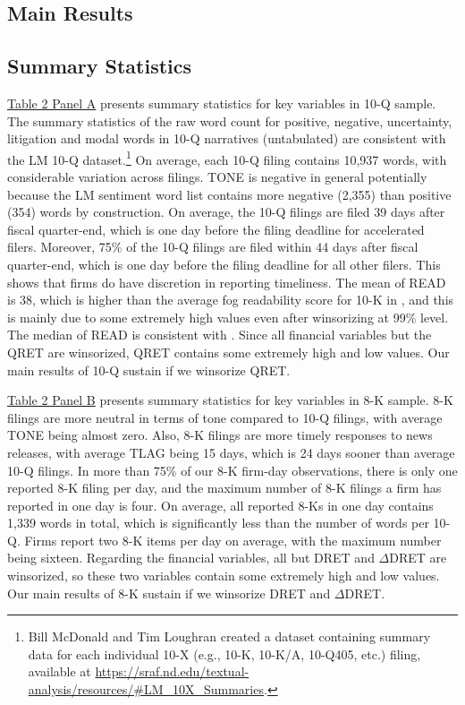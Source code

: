 \documentclass[letterpaper,11pt]{article}
\begin{document}
\begin{spacing}{1.5}
\section{Main Results}
\subsection{Summary Statistics}
\hyperref[T2PA]{Table 2 Panel A} presents summary statistics for key variables in 10-Q sample. The summary statistics of the raw word count for positive, negative, uncertainty, litigation and modal words in 10-Q narratives (untabulated) are consistent with the LM 10-Q dataset.\footnote{Bill McDonald and Tim Loughran created a dataset containing summary data for each individual 10-X (e.g., 10-K, 10-K/A, 10-Q405, etc.) filing, available at \url{https://sraf.nd.edu/textual-analysis/resources/\#LM_10X_Summaries}.} On average, each 10-Q filing contains 10,937 words, with considerable variation across filings. TONE is negative in general potentially because the LM sentiment word list contains more negative (2,355) than positive (354) words by construction. On average, the 10-Q filings are filed 39 days after fiscal quarter-end, which is one day before the filing deadline for accelerated filers. Moreover, 75\% of the 10-Q filings are filed within 44 days after fiscal quarter-end, which is one day before the filing deadline for all other filers. This shows that firms do have discretion in reporting timeliness. The mean of READ is 38, which is higher than the average fog readability score for 10-K in , and this is mainly due to some extremely high values even after winsorizing at 99\% level. The median of READ is consistent with . Since all financial variables but the QRET are winsorized, QRET contains some extremely high and low values. Our main results of 10-Q sustain if we winsorize QRET.

\hyperref[T2PB]{Table 2 Panel B} presents summary statistics for key variables in 8-K sample. 8-K filings are more neutral in terms of tone compared to 10-Q filings, with average TONE being almost zero. Also, 8-K filings are more timely responses to news releases, with average TLAG being 15 days, which is 24 days sooner than average 10-Q filings. In more than 75\% of our 8-K firm-day observations, there is only one reported 8-K filing per day, and the maximum number of 8-K filings a firm has reported in one day is four. On average, all reported 8-Ks in one day contains 1,339 words in total, which is significantly less than the number of words per 10-Q. Firms report two 8-K items per day on average, with the maximum number being sixteen. Regarding the financial variables, all but DRET and $\Delta$DRET are winsorized, so these two variables contain some extremely high and low values. Our main results of 8-K sustain if we winsorize DRET and $\Delta$DRET.


\end{spacing}
\end{document}
